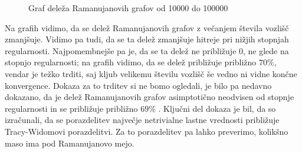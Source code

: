 \begin{figure}[H]
    \centering
    \caption{Graf deleža Ramanujanovih grafov od 10000 do 100000}
\end{figure}
Na grafih vidimo, da se delež Ramanujanovih grafov z večanjem števila vozlišč zmanjšuje. Vidimo pa tudi, da se ta delež zmanjšuje hitreje pri nižjih stopnjah regularnosti. Najpomembnejše pa je, da se ta delež ne približuje \(0\), ne glede na stopnjo regularnosti; na grafih vidimo, da se delež približuje približno \(70\%\), vendar je težko trditi, saj kljub velikemu številu vozlišč še vedno ni vidne končne konvergence. Dokaza za to trditev si ne bomo ogledali, je bilo pa nedavno dokazano, da je delež Ramanujanovih grafov asimptotično neodvisen od stopnje regularnosti in se približuje približno \(69\%\) \cite{huang2024ramanujanpropertyedgeuniversality}. Ključni del dokaza je bil, da so izračunali, da se porazdelitev največje netrivialne lastne vrednosti približuje Tracy-Widomovi porazdelitvi. Za to porazdelitev pa lahko preverimo, kolikšno maso ima pod Ramanujanovo mejo.

